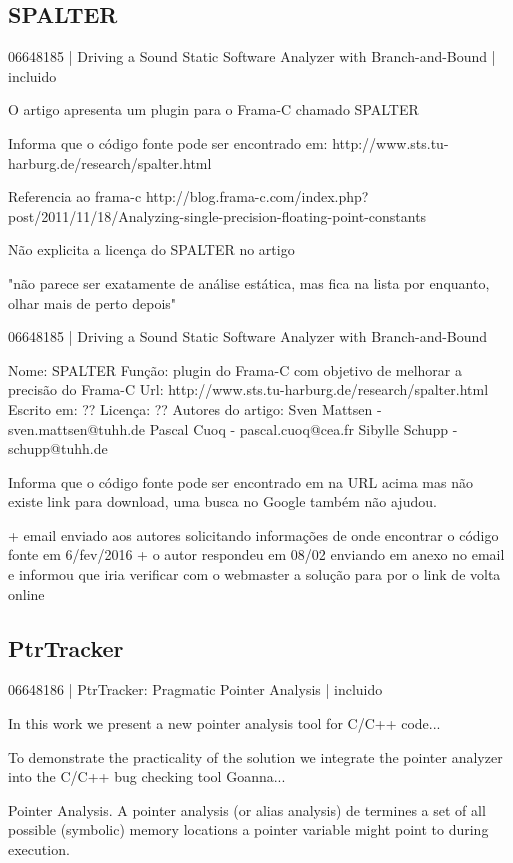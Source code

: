 \subsection{SPALTER}

06648185 | Driving a Sound Static Software Analyzer with Branch-and-Bound | incluido

O artigo apresenta um plugin para o Frama-C chamado SPALTER

Informa que o código fonte pode ser encontrado em:
http://www.sts.tu-harburg.de/research/spalter.html

Referencia ao frama-c
http://blog.frama-c.com/index.php?post/2011/11/18/Analyzing-single-precision-floating-point-constants

Não explicita a licença do SPALTER no artigo

"não parece ser exatamente de análise estática, mas fica na lista por
enquanto, olhar mais de perto depois"

06648185 | Driving a Sound Static Software Analyzer with Branch-and-Bound

Nome: SPALTER
Função: plugin do Frama-C com objetivo de melhorar a precisão do Frama-C
Url: http://www.sts.tu-harburg.de/research/spalter.html
Escrito em: ??
Licença: ??
Autores do artigo: Sven Mattsen - sven.mattsen@tuhh.de
                   Pascal Cuoq - pascal.cuoq@cea.fr
                   Sibylle Schupp - schupp@tuhh.de

Informa que o código fonte pode ser encontrado em na URL acima mas não existe
link para download, uma busca no Google também não ajudou.

+ email enviado aos autores solicitando informações de onde encontrar o código fonte
  em 6/fev/2016
  + o autor respondeu em 08/02 enviando em anexo no email e informou que iria verificar
    com o webmaster a solução para por o link de volta online


\subsection{PtrTracker}

06648186 | PtrTracker: Pragmatic Pointer Analysis | incluido

In this work we present a new pointer analysis tool for C/C++ code...

To demonstrate the practicality of the solution we integrate the pointer
analyzer into the C/C++ bug checking tool Goanna...

Pointer Analysis. A pointer analysis (or alias analysis) de
termines a set of all possible (symbolic) memory locations a
pointer variable might point to during execution.

